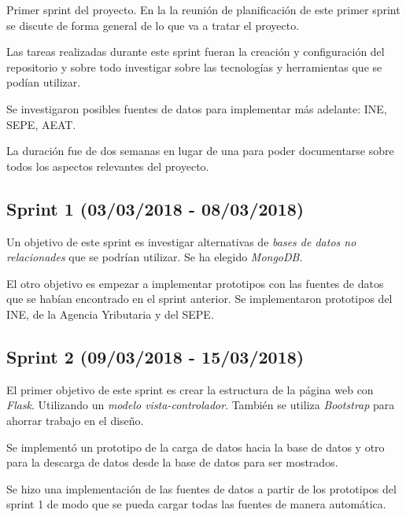Primer sprint del proyecto. En la la reunión de planificación de este primer sprint se discute de forma general de lo que va a tratar el proyecto. 

Las tareas realizadas durante este sprint fueran la creación y configuración del repositorio y sobre todo investigar sobre las tecnologías y herramientas que se podían utilizar.

Se investigaron posibles fuentes de datos para implementar más adelante: INE, SEPE, AEAT.

La duración fue de dos semanas en lugar de una para poder documentarse sobre todos los aspectos relevantes del proyecto.



\subsection{Sprint 1 (03/03/2018 - 08/03/2018)}

Un objetivo de este sprint es investigar alternativas de \textit{bases de datos no relacionades} que se podrían utilizar. Se ha elegido \textit{MongoDB}.

El otro objetivo es empezar a implementar prototipos con las fuentes de datos que se habían encontrado en el sprint anterior. Se implementaron prototipos del INE, de la Agencia Yributaria y del SEPE.



\subsection{Sprint 2 (09/03/2018 - 15/03/2018)}

El primer objetivo de este sprint es crear la estructura de la página web con \textit{Flask}. Utilizando un \textit{modelo vista-controlador}. También se utiliza \textit{Bootstrap} para ahorrar trabajo en el diseño.

Se implementó un prototipo de la carga de datos hacia la base de datos y otro para la descarga de datos desde la base de datos para ser mostrados.

Se hizo una implementación de las fuentes de datos a partir de los prototipos del sprint 1 de modo que se pueda cargar todas las fuentes de manera automática.

